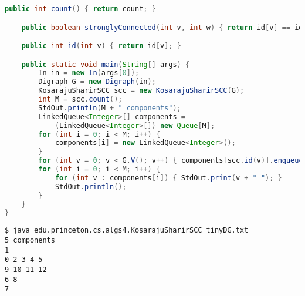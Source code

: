 \documentclass[8pt,a4paper,compress]{beamer}
\begin{document}
\begin{frame}[fragile]
\pause

\begin{lstlisting}[language=Java]
    public int count() { return count; }

    public boolean stronglyConnected(int v, int w) { return id[v] == id[w]; }

    public int id(int v) { return id[v]; }

    public static void main(String[] args) {
        In in = new In(args[0]);
        Digraph G = new Digraph(in);
        KosarajuSharirSCC scc = new KosarajuSharirSCC(G);
        int M = scc.count();
        StdOut.println(M + " components");
        LinkedQueue<Integer>[] components = 
            (LinkedQueue<Integer>[]) new Queue[M];
        for (int i = 0; i < M; i++) { 
            components[i] = new LinkedQueue<Integer>(); 
        }
        for (int v = 0; v < G.V(); v++) { components[scc.id(v)].enqueue(v); }
        for (int i = 0; i < M; i++) {
            for (int v : components[i]) { StdOut.print(v + " "); }
            StdOut.println();
        }
    }
}
\end{lstlisting}

\pause

\begin{lstlisting}[language={}]
$ java edu.princeton.cs.algs4.KosarajuSharirSCC tinyDG.txt 
5 components
1 
0 2 3 4 5 
9 10 11 12 
6 8 
7 
\end{lstlisting}
\end{frame}
\end{document}
